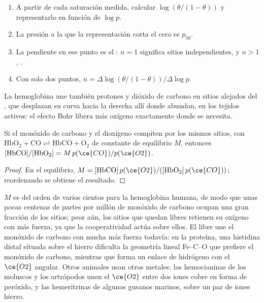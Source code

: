 \begin{method}\label{met:b3:bioinorganic:hill-plot}
\begin{enumerate}
  \item A partir de cada saturación medida, calcular $\log(\theta/(1 - \theta))$ y representarlo en función de $\log p$.
  \item La presión a la que la representación corta el cero es $p_{50}$.
  \item La pendiente en ese punto es el : $n = 1$ significa sitios
        independientes, y $n > 1$, .
  \item Con solo dos puntos, $n = \Delta\log(\theta/(1 - \theta))/\Delta\log p$.
\end{enumerate}
\end{method}

La hemoglobina une también protones y dióxido de carbono en sitios alejados del ,
que desplazan su curva hacia la derecha allí donde abundan, en los tejidos activos:
el efecto Bohr libera más oxígeno exactamente donde se necesita.

\begin{proposition}\label{prop:b3:bioinorganic:haldane}
Si el monóxido de carbono y el dioxígeno compiten por los mismos sitios, con
$\mathrm{HbO_2 + CO \rightleftharpoons HbCO + O_2}$ de constante de equilibrio $M$, entonces
$[\mathrm{HbCO}]/[\mathrm{HbO_2}] = M\,p(\ce{CO})/p(\ce{O2})$.
\end{proposition}

\begin{proof}
En el equilibrio, $M = [\mathrm{HbCO}]\,p(\ce{O2})/([\mathrm{HbO_2}]\,p(\ce{CO}))$; reordenando se obtiene el resultado.
\end{proof}

$M$ es del orden de varios cientos para la hemoglobina humana, de modo que unas pocas centenas de partes por
millón de monóxido de carbono ocupan una gran fracción de los sitios; peor aún, los
sitios que quedan libres retienen su oxígeno con más fuerza, ya que la cooperatividad
actúa sobre ellos. El  libre une el monóxido de carbono con mucha más fuerza todavía: en
la proteína, una histidina distal situada sobre el hierro dificulta la geometría lineal Fe--C--O
que prefiere el monóxido de carbono, mientras que forma un enlace de hidrógeno con el $\ce{O2}$ angular.
Otros animales usan otros metales: las hemocianinas de los moluscos y los artrópodos
unen el $\ce{O2}$ entre dos iones cobre en forma de peróxido, y las hemeritrinas de algunos gusanos
marinos, sobre un par de iones hierro.

